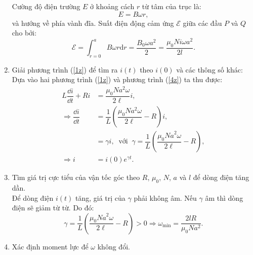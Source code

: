 \begin{loigiai}
\begin{enumerate}[1)]
\begin{center}
\end{center}
Cường độ điện trường $E$ ở khoảng cách $r$ từ tâm của trục là:
\[E=B \omega r, \tag{3} \]
và hướng về phía vành đĩa. Suất điện động cảm ứng $\mathcal{E}$ giữa các đầu $P$ và $Q$ cho bởi:
\[\mathcal{E} = \int_{r=0}^{a} B \omega r \mathrm{d}r=\dfrac{B_{0} \omega a^{2}}{2}=\dfrac{\mu_{0} N i \omega a^{2}}{2 l}. \tag{4} \label{4z}\]
\item Giải phương trình (\ref{1z}) để tìm ra $i(t)$ theo $i(0)$ và các thông số khác:\\
Dựa vào hai phương trình (\ref{1z}) và phương trình (\ref{4z}) ta thu được:
\begin{align*} 
L \dfrac{\dd i}{\dd t}+R i&=\dfrac{\mu_{0} N a^{2} \omega}{2 \ell} i,\\
\Rightarrow \dfrac{\dd i}{\dd t}&=\dfrac{1}{L}\left(\dfrac{\mu_{0} N a^{2} \omega}{2 \ell}-R\right)
i,\\
&=\gamma i, \ \text{ với } \ \gamma=\dfrac{1}{L}\left(\dfrac{\mu_{0} {Na}^{2} \omega}{2 \ell}-R\right), \\  \Rightarrow i&=i(0) e^{\gamma t}. \tag{5} \label{5z} \end{align*}
\item Tìm giá trị cực tiểu của vận tốc góc theo $R$, $\mu_0$, $N$, $a$ và $l$ để dòng điện tăng dần. \\
Để dòng điện $i(t)$ tăng, giá trị của $\gamma$ phải không âm. Nếu $\gamma$ âm thì dòng điện sẽ giảm từ từ. Do đó:
\[\gamma = \dfrac{1}{L}\left(\dfrac{\mu_{0}{Na}^{2} \omega}{2 \ell}-R\right)>0 \Rightarrow \omega_{\min}= \dfrac{2lR}{\mu_{0} N a^2}. \tag{6} \]
\item Xác định moment lực để $\omega$ không đổi.
\begin{center}

\begin{tikzpicture}[x=0.75pt,y=0.75pt,yscale=-1.2,xscale=1.2]


\end{tikzpicture}
\end{center}
\end{enumerate}
\end{loigiai}
